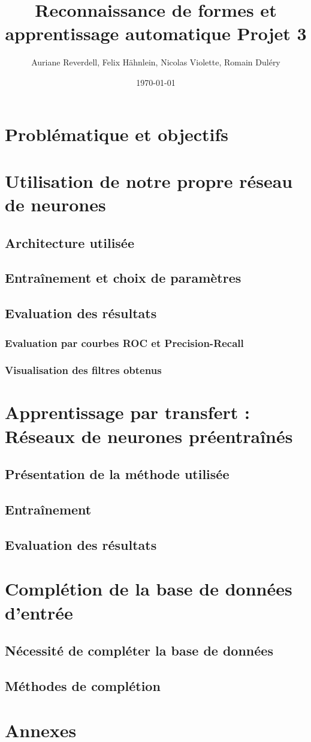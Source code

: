 \documentclass[a4paper,11pt]{article}
\title{Reconnaissance de formes et apprentissage automatique Projet 3}
\author{Auriane Reverdell, Felix Hähnlein, Nicolas Violette, Romain Duléry}
\date{\today}
\begin{document}
\maketitle
\vspace{1cm}

\section{Problématique et objectifs}

\section{Utilisation de notre propre réseau de neurones}
\subsection{Architecture utilisée}
\subsection{Entraînement et choix de paramètres}
\subsection{Evaluation des résultats}
\subsubsection{Evaluation par courbes ROC et Precision-Recall}
\subsubsection{Visualisation des filtres obtenus}

\section{Apprentissage par transfert : Réseaux de neurones préentraînés}
\subsection{Présentation de la méthode utilisée}
\subsection{Entraînement}
\subsection{Evaluation des résultats}

\section{Complétion de la base de données d'entrée}
\subsection{Nécessité de compléter la base de données}
\subsection{Méthodes de complétion}

\section{Annexes}
\end{document}
